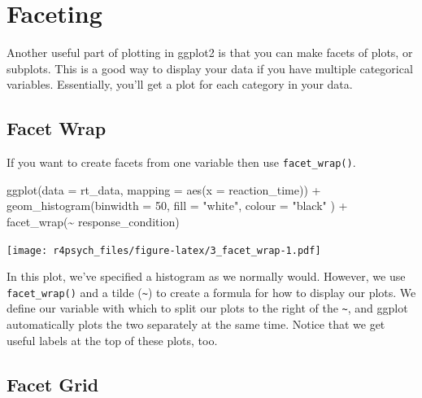 \documentclass[
]{book}
\newenvironment{Shaded}{\begin{snugshade}}{\end{snugshade}}
\newcommand{\AttributeTok}[1]{\textcolor[rgb]{0.77,0.63,0.00}{#1}}
\newcommand{\DecValTok}[1]{\textcolor[rgb]{0.00,0.00,0.81}{#1}}
\newcommand{\FunctionTok}[1]{\textcolor[rgb]{0.00,0.00,0.00}{#1}}
\newcommand{\NormalTok}[1]{#1}
\newcommand{\SpecialCharTok}[1]{\textcolor[rgb]{0.00,0.00,0.00}{#1}}
\newcommand{\StringTok}[1]{\textcolor[rgb]{0.31,0.60,0.02}{#1}}
\begin{document}
\hypertarget{faceting}{%
\section{Faceting}\label{faceting}}

Another useful part of plotting in ggplot2 is that you can make facets of plots, or subplots. This is a good way to display your data if you have multiple categorical variables. Essentially, you'll get a plot for each category in your data.

\hypertarget{facet-wrap}{%
\subsection{Facet Wrap}\label{facet-wrap}}

If you want to create facets from one variable then use \texttt{facet\_wrap()}.

\begin{Shaded}
\begin{Highlighting}[]
\FunctionTok{ggplot}\NormalTok{(}\AttributeTok{data =}\NormalTok{ rt\_data, }\AttributeTok{mapping =} \FunctionTok{aes}\NormalTok{(}\AttributeTok{x =}\NormalTok{ reaction\_time)) }\SpecialCharTok{+}
  \FunctionTok{geom\_histogram}\NormalTok{(}\AttributeTok{binwidth =} \DecValTok{50}\NormalTok{, }
                 \AttributeTok{fill =} \StringTok{"white"}\NormalTok{, }
                 \AttributeTok{colour =} \StringTok{"black"}
\NormalTok{                 ) }\SpecialCharTok{+}
  \FunctionTok{facet\_wrap}\NormalTok{(}\SpecialCharTok{\textasciitilde{}}\NormalTok{ response\_condition)}
\end{Highlighting}
\end{Shaded}

\texttt{[image: r4psych\_files/figure-latex/3\_facet\_wrap-1.pdf]}

In this plot, we've specified a histogram as we normally would. However, we use \texttt{facet\_wrap()} and a tilde (\texttt{\textasciitilde{}}) to create a formula for how to display our plots. We define our variable with which to split our plots to the right of the \texttt{\textasciitilde{}}, and ggplot automatically plots the two separately at the same time. Notice that we get useful labels at the top of these plots, too.

\hypertarget{facet-grid}{%
\subsection{Facet Grid}\label{facet-grid}}
\end{document}
